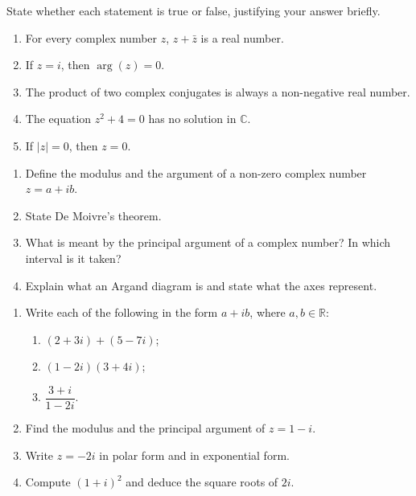 \documentclass[11pt]{article}
\newcommand{\cle}[1]{{\popxbold\color{popdark}#1}}
\begin{document}
\begin{exercice}
State whether each statement is true or false, justifying your answer briefly.
\begin{enumerate}
\item For every complex number $z$, $z + \bar{z}$ is a real number.
\item If $z = i$, then $\arg(z) = 0$.
\item The product of two complex conjugates is always a non-negative real number.
\item The equation $z^2 + 4 = 0$ has no solution in $\mathbb{C}$.
\item If $|z| = 0$, then $z = 0$.
\end{enumerate}
\end{exercice}

\begin{exercice}
\begin{enumerate}
\item Define the \cle{modulus} and the \cle{argument} of a non-zero complex number $z = a + ib$.
\item State \cle{De Moivre's theorem}.
\item What is meant by the \cle{principal argument} of a complex number? In which interval is it taken?
\item Explain what an \cle{Argand diagram} is and state what the axes represent.
\end{enumerate}
\end{exercice}

\begin{exercice}
\begin{enumerate}
\item Write each of the following in the form $a + ib$, where $a, b \in \mathbb{R}$:
\begin{enumerate}
\item $(2 + 3i) + (5 - 7i)$;
\item $(1 - 2i)(3 + 4i)$;
\item $\dfrac{3 + i}{1 - 2i}$.
\end{enumerate}
\item Find the modulus and the principal argument of $z = 1 - i$.
\item Write $z = -2i$ in polar form and in exponential form.
\item Compute $(1 + i)^2$ and deduce the square roots of $2i$.
\end{enumerate}
\end{exercice}
\end{document}
